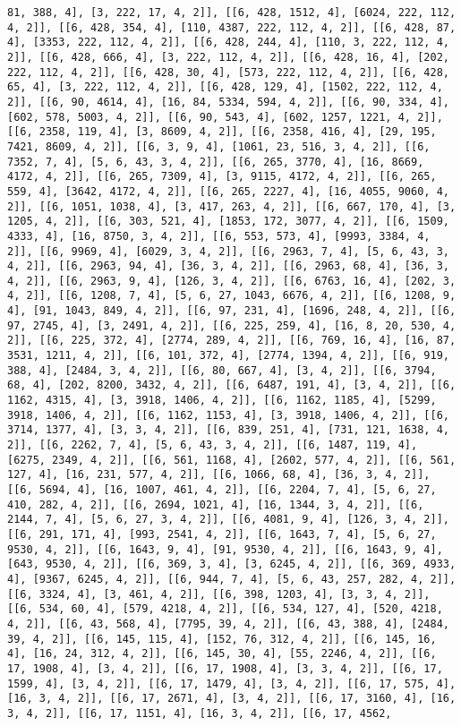 \documentclass[12pt,fleqn]{article}\usepackage{../../common}
\begin{document}
\begin{verbatim}
81, 388, 4], [3, 222, 17, 4, 2]], [[6, 428, 1512, 4], [6024, 222, 112, 4, 2]], [[6, 428, 354, 4], [110, 4387, 222, 112, 4, 2]], [[6, 428, 87, 4], [3353, 222, 112, 4, 2]], [[6, 428, 244, 4], [110, 3, 222, 112, 4, 2]], [[6, 428, 666, 4], [3, 222, 112, 4, 2]], [[6, 428, 16, 4], [202, 222, 112, 4, 2]], [[6, 428, 30, 4], [573, 222, 112, 4, 2]], [[6, 428, 65, 4], [3, 222, 112, 4, 2]], [[6, 428, 129, 4], [1502, 222, 112, 4, 2]], [[6, 90, 4614, 4], [16, 84, 5334, 594, 4, 2]], [[6, 90, 334, 4], [602, 578, 5003, 4, 2]], [[6, 90, 543, 4], [602, 1257, 1221, 4, 2]], [[6, 2358, 119, 4], [3, 8609, 4, 2]], [[6, 2358, 416, 4], [29, 195, 7421, 8609, 4, 2]], [[6, 3, 9, 4], [1061, 23, 516, 3, 4, 2]], [[6, 7352, 7, 4], [5, 6, 43, 3, 4, 2]], [[6, 265, 3770, 4], [16, 8669, 4172, 4, 2]], [[6, 265, 7309, 4], [3, 9115, 4172, 4, 2]], [[6, 265, 559, 4], [3642, 4172, 4, 2]], [[6, 265, 2227, 4], [16, 4055, 9060, 4, 2]], [[6, 1051, 1038, 4], [3, 417, 263, 4, 2]], [[6, 667, 170, 4], [3, 1205, 4, 2]], [[6, 303, 521, 4], [1853, 172, 3077, 4, 2]], [[6, 1509, 4333, 4], [16, 8750, 3, 4, 2]], [[6, 553, 573, 4], [9993, 3384, 4, 2]], [[6, 9969, 4], [6029, 3, 4, 2]], [[6, 2963, 7, 4], [5, 6, 43, 3, 4, 2]], [[6, 2963, 94, 4], [36, 3, 4, 2]], [[6, 2963, 68, 4], [36, 3, 4, 2]], [[6, 2963, 9, 4], [126, 3, 4, 2]], [[6, 6763, 16, 4], [202, 3, 4, 2]], [[6, 1208, 7, 4], [5, 6, 27, 1043, 6676, 4, 2]], [[6, 1208, 9, 4], [91, 1043, 849, 4, 2]], [[6, 97, 231, 4], [1696, 248, 4, 2]], [[6, 97, 2745, 4], [3, 2491, 4, 2]], [[6, 225, 259, 4], [16, 8, 20, 530, 4, 2]], [[6, 225, 372, 4], [2774, 289, 4, 2]], [[6, 769, 16, 4], [16, 87, 3531, 1211, 4, 2]], [[6, 101, 372, 4], [2774, 1394, 4, 2]], [[6, 919, 388, 4], [2484, 3, 4, 2]], [[6, 80, 667, 4], [3, 4, 2]], [[6, 3794, 68, 4], [202, 8200, 3432, 4, 2]], [[6, 6487, 191, 4], [3, 4, 2]], [[6, 1162, 4315, 4], [3, 3918, 1406, 4, 2]], [[6, 1162, 1185, 4], [5299, 3918, 1406, 4, 2]], [[6, 1162, 1153, 4], [3, 3918, 1406, 4, 2]], [[6, 3714, 1377, 4], [3, 3, 4, 2]], [[6, 839, 251, 4], [731, 121, 1638, 4, 2]], [[6, 2262, 7, 4], [5, 6, 43, 3, 4, 2]], [[6, 1487, 119, 4], [6275, 2349, 4, 2]], [[6, 561, 1168, 4], [2602, 577, 4, 2]], [[6, 561, 127, 4], [16, 231, 577, 4, 2]], [[6, 1066, 68, 4], [36, 3, 4, 2]], [[6, 5694, 4], [16, 1007, 461, 4, 2]], [[6, 2204, 7, 4], [5, 6, 27, 410, 282, 4, 2]], [[6, 2694, 1021, 4], [16, 1344, 3, 4, 2]], [[6, 2144, 7, 4], [5, 6, 27, 3, 4, 2]], [[6, 4081, 9, 4], [126, 3, 4, 2]], [[6, 291, 171, 4], [993, 2541, 4, 2]], [[6, 1643, 7, 4], [5, 6, 27, 9530, 4, 2]], [[6, 1643, 9, 4], [91, 9530, 4, 2]], [[6, 1643, 9, 4], [643, 9530, 4, 2]], [[6, 369, 3, 4], [3, 6245, 4, 2]], [[6, 369, 4933, 4], [9367, 6245, 4, 2]], [[6, 944, 7, 4], [5, 6, 43, 257, 282, 4, 2]], [[6, 3324, 4], [3, 461, 4, 2]], [[6, 398, 1203, 4], [3, 3, 4, 2]], [[6, 534, 60, 4], [579, 4218, 4, 2]], [[6, 534, 127, 4], [520, 4218, 4, 2]], [[6, 43, 568, 4], [7795, 39, 4, 2]], [[6, 43, 388, 4], [2484, 39, 4, 2]], [[6, 145, 115, 4], [152, 76, 312, 4, 2]], [[6, 145, 16, 4], [16, 24, 312, 4, 2]], [[6, 145, 30, 4], [55, 2246, 4, 2]], [[6, 17, 1908, 4], [3, 4, 2]], [[6, 17, 1908, 4], [3, 3, 4, 2]], [[6, 17, 1599, 4], [3, 4, 2]], [[6, 17, 1479, 4], [3, 4, 2]], [[6, 17, 575, 4], [16, 3, 4, 2]], [[6, 17, 2671, 4], [3, 4, 2]], [[6, 17, 3160, 4], [16, 3, 4, 2]], [[6, 17, 1151, 4], [16, 3, 4, 2]], [[6, 17, 4562, 
\end{verbatim}
\end{document}
